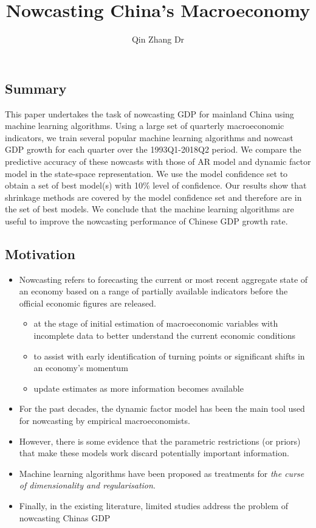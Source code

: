 \documentclass[thesis]{hmcposter}
\author{Qin Zhang Dr}
\title{Nowcasting China's Macroeconomy}
\begin{document}
\begin{poster}
\subsection{Summary}
This paper undertakes the task of nowcasting GDP for mainland China using machine learning algorithms. Using a large set of quarterly macroeconomic indicators, we train several popular machine learning algorithms and nowcast GDP growth for each quarter over the 1993Q1-2018Q2 period. We compare the predictive accuracy of these nowcasts with those of AR model and dynamic factor model in the state-space representation. We use the model confidence set to obtain a set of best model(s) with 10\% level of confidence. Our results show that shrinkage methods are covered by the model confidence set and therefore are in the set of best models. We conclude that the machine learning algorithms are useful to improve the nowcasting performance of Chinese GDP growth rate.

\subsection{Motivation}%
\begin{itemize}
\item Nowcasting refers to forecasting the current or most recent aggregate state of an economy based on a range of partially available indicators before the official economic figures are released.
\begin{itemize}
    \item at the stage of initial estimation of macroeconomic variables with incomplete data to better understand the current economic conditions
    \item to assist with early identification of turning points or significant shifts in an economy's momentum
    \item update estimates as more information becomes available
\end{itemize}
\item For the past decades, the dynamic factor model has been the main tool used for nowcasting by empirical macroeconomists.
\item However, there is some evidence that the parametric restrictions (or priors) that make these models work discard potentially important information.
\item Machine learning algorithms have been proposed as treatments for \textit{the curse of dimensionality and regularisation}.
\item Finally, in the existing literature, limited studies address the problem of nowcasting Chinas GDP
\end{itemize}



\end{poster}
\end{document}
